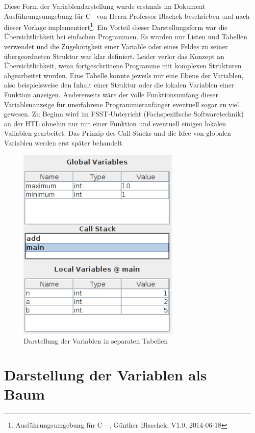 Diese Form der Variablendarstellung wurde erstmals im Dokument Ausführungsumgebung für C-- von Herrn Professor Blachek beschrieben und nach dieser Vorlage implementiert\footnote{Ausführungsumgebung für C––, Günther Blaschek, V1.0, 2014-06-18}. Ein Vorteil dieser Darstellungsform war die Übersichtlichkeit bei einfachen Programmen. Es wurden nur Listen und Tabellen verwendet und die Zugehörigkeit einer Variable oder eines Feldes zu seiner übergeordneten Struktur war klar definiert. Leider verlor das Konzept an Übersichtlichkeit, wenn fortgeschrittene Programme mit komplexen Strukturen abgearbeitet wurden. Eine Tabelle konnte jeweils nur eine Ebene der Variablen, also beispielsweise den Inhalt einer Struktur oder die lokalen Variablen einer Funktion anzeigen.
\newline
Andererseits wäre der volle Funktionsumfang dieser Variablenanzeige für unerfahrene Programmieranfänger eventuell sogar zu viel gewesen. Zu Beginn wird im FSST-Unterricht (Fachspezifische Softwaretechnik) an der HTL ohnehin nur mit einer Funktion und eventuell einigen lokalen Valiablen gearbeitet. Das Prinzip des Call Stacks und die Idee von globalen Variablen werden erst später behandelt.
\begin{figure}
\includegraphics[width=8cm]{./media/images/gui/var/callstack.png}
\caption{Darstellung der Variablen in separaten Tabellen}
\label{var_sep}
\end{figure}

\section{Darstellung der Variablen als Baum}

